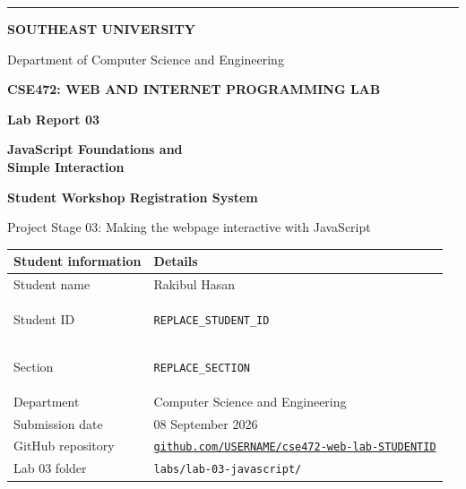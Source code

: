 \documentclass[11pt,a4paper]{article}
\newcommand{\studentname}{Rakibul Hasan}
\newcommand{\studentid}{REPLACE\_STUDENT\_ID}
\newcommand{\studentsection}{REPLACE\_SECTION}
\newcommand{\githuburl}{https://github.com/USERNAME/cse472-web-lab-STUDENTID}
\newcommand{\submissiondate}{08 September 2026}
\newcommand{\placeholder}[1]{\colorbox{warningbg}{\textcolor{warning}{\strut\texttt{#1}}}}
\begin{document}

\begin{titlepage}
    \thispagestyle{empty}
    {\color{navy}\rule{\textwidth}{7pt}}

    \vspace{1.1cm}
    {\large\bfseries\color{cyan}SOUTHEAST UNIVERSITY}\par
    \vspace{0.15cm}
    {\large\color{ink}Department of Computer Science and Engineering}\par

    \vspace{1.35cm}
    {\small\bfseries\color{muted}\MakeUppercase{CSE472: Web and Internet Programming Lab}}\par
    \vspace{0.45cm}
    {\fontsize{31}{37}\selectfont\bfseries\color{navy}Lab Report 03}\par
    \vspace{0.28cm}
    {\fontsize{22}{28}\selectfont\bfseries\color{blue}JavaScript Foundations and\\Simple Interaction}\par

    \vspace{0.7cm}
    \colorbox{softcyan}{%
        \begin{minipage}{0.94\textwidth}
            \vspace{0.32cm}
            \centering
            {\large\bfseries\color{navy}Student Workshop Registration System}\par
            \vspace{0.12cm}
            {\color{muted}Project Stage 03: Making the webpage interactive with JavaScript}
            \vspace{0.32cm}
        \end{minipage}
    }

    \vfill

    \begin{tabularx}{\textwidth}{L{0.34\textwidth}Y}
        \toprule
        \textbf{Student information} & \textbf{Details} \\
        \midrule
        Student name & \studentname \\
        Student ID & \placeholder{\studentid} \\
        Section & \placeholder{\studentsection} \\
        Department & Computer Science and Engineering \\
        Submission date & \submissiondate \\
        GitHub repository & \href{\githuburl}{\texttt{github.com/USERNAME/cse472-web-lab-STUDENTID}} \\
        Lab 03 folder & \texttt{labs/lab-03-javascript/} \\
        \bottomrule
    \end{tabularx}


\end{titlepage}
\end{document}
